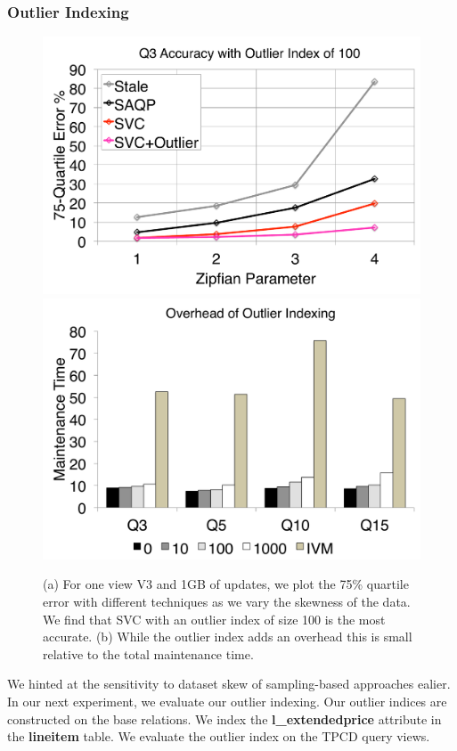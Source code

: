 \subsubsection{Outlier Indexing}

\begin{figure}[t]
\centering
 \includegraphics[scale=0.14]{exp/msoi_1.pdf}
 \includegraphics[scale=0.14]{exp/msoi_2.pdf}

 \caption{(a) For one view V3 and 1GB of updates, we plot the 75\% quartile error with different techniques as we vary the skewness of the data. We find that SVC with an outlier index of size 100 is the most accurate. (b) While the outlier index adds an overhead this is small relative to the total maintenance time. \label{exp5-oi}}
\end{figure}
We hinted at the sensitivity to dataset skew of sampling-based approaches ealier.
In our next experiment, we evaluate our outlier indexing.
Our outlier indices are constructed on the base relations.
We index the \textbf{l\_extendedprice} attribute in the \textbf{lineitem} table.
We evaluate the outlier index on the TPCD query views.

